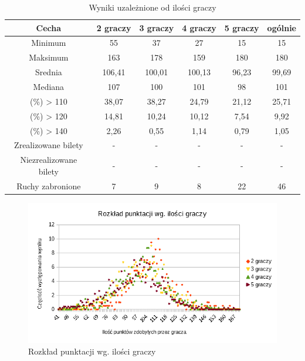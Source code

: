 \documentclass[12pt, oneside]{report}
\begin{document}
\begin{table}[h]
	\begin{center}
		\begin{tabular}{| c | c | c | c | c | c |} \hline
			Cecha & 2 graczy & 3 graczy & 4 graczy & 5 graczy & ogólnie \\ \hline
			Minimum & 55 & 37 & 27 & 15 & 15 \\ \hline
			Maksimum & 163 & 178 & 159 & 180 & 180 \\ \hline
			Srednia & 106,41 & 100,01 & 100,13 & 96,23 & 99,69 \\ \hline
			Mediana & 107 & 100 & 101 & 98 & 101 \\ \hline
			(\%) > 110 & 38,07 & 38,27 & 24,79 & 21,12 & 25,71 \\ \hline
			(\%) > 120 & 14,81 & 10,24 & 10,12 & 7,54 & 9,92 \\ \hline
			(\%) > 140 & 2,26 & 0,55 & 1,14 & 0,79 & 1,05 \\ \hline
			Zrealizowane bilety & - & - & - & - & - \\ \hline
			Niezrealizowane bilety & - & - & - & - & - \\ \hline
			Ruchy zabronione & 7&9&8&22&46 \\ \hline
		\end{tabular}
		\caption{Wyniki uzależnione od ilości graczy}
		\label{table:nn_sizeresult}
	\end{center}
\end{table}

\begin{figure}[h]
	\includegraphics{NNWykrespunktow.png}
	\caption{Rozkład punktacji wg. ilości graczy}
	\label{figure:player_points_nn}
\end{figure}
\end{document}
